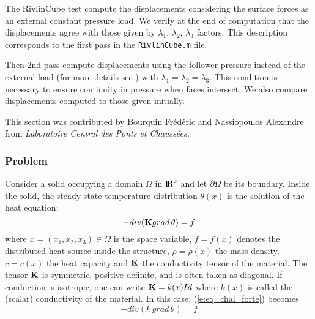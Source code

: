 The RivlinCube test compute the displacements considering the surface forces as an external constant pressure load. We verify at the end of computation that the displacements agree with those given by $\lambda_1$, $\lambda_2$, $\lambda_3$ factors. This description corresponds to the first pass in the {\tt RivlinCube.m} file.

Then 2nd pass compute displacements using the follower pressure instead of the external load (for more details see \fsc ) with $\lambda_1=\lambda_2=\lambda_3$. This condition is necessary to ensure continuity in pressure when faces intersect. We also compare displacements computed to those given initially.




This section was contributed by Bourquin Fr\'{e}d\'{e}ric and Nassiopoulos Alexandre from { \it Laboratoire Central des Ponts et Chauss\'{e}es.}  

\subsubsection{Problem}

Consider a solid occupying a domain $\Omega$ in $\mbox{I\hspace{-.15em}R}^3$ and let $\partial\Omega$ be its boundary. 
Inside the solid, the steady state temperature distribution $\theta(x)$ is the solution of the heat equation:
\begin{equation} \label{e:eq_chal_forte}
- div ({\bf K} grad \, \theta) = f
\end{equation}
where $x=(x_1,x_2,x_3) \in \Omega$ is the space variable, $f=f(x)$ denotes the distributed heat source inside the structure, $\rho=\rho(x)$ the mass density, $c=c(x)$ the  heat capacity and ${\bf K}$ the conductivity tensor of the material. The tensor ${\bf K}$ is symmetric, positive definite, and is often taken as diagonal. If conduction is isotropic, one can write ${\bf K}=k(x)Id$ where $k(x)$ is called the (scalar) conductivity of the material. In this case, (\ref{e:eq_chal_forte})
becomes 
\begin{equation}
- div (k \, grad \, \theta) = f
\end{equation}

